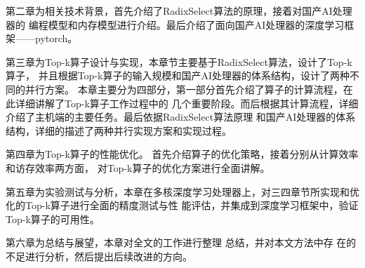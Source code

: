 第二章为相关技术背景，首先介绍了RadixSelect算法的原理，接着对国产AI处理器的
编程模型和内存模型进行介绍。最后介绍了面向国产AI处理器的深度学习框架——pytorch。


第三章为Top-k算子设计与实现，本章节主要基于RadixSelect算法，设计了Top-k算子，
并且根据Top-k算子的输入规模和国产AI处理器的体系结构，设计了两种不同的并行方案。
本章主要分为四部分，第一部分首先介绍了算子的计算流程，在此详细讲解了Top-k算子工作过程中的
几个重要阶段。而后根据其计算流程，详细介绍了主机端的主要任务。最后依据RadixSelect算法原理
和国产AI处理器的体系结构，详细的描述了两种并行实现方案和实现过程。

第四章为Top-k算子的性能优化。
首先介绍算子的优化策略，接着分别从计算效率和访存效率两方面，
对Top-k算子的优化方案进行全面讲解。
 
 第五章为实验测试与分析，本章在多核深度学习处理器上，对三四章节所实现和优化的Top-k算子进行全面的精度测试与性
 能评估，并集成到深度学习框架中，验证Top-k算子的可用性。 
 
 第六章为总结与展望，本章对全文的工作进行整理
 总结，并对本文方法中存 在的不足进行分析，然后提出后续改进的方向。
